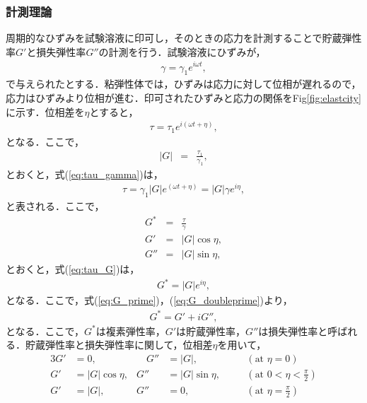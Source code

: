 \subsubsection{計測理論}
周期的なひずみを試験溶液に印可し，そのときの応力を計測することで貯蔵弾性率$G'$と損失弾性率$G''$の計測を行う．試験溶液にひずみが，
\begin{eqnarray}
    \gamma=\gamma_1e^{i\omega{}t} ,
\end{eqnarray}
で与えられたとする．粘弾性体では，ひずみは応力に対して位相が遅れるので，応力はひずみより位相が進む．印可されたひずみと応力の関係をFig\ref{fig:elastcity}に示す．位相差を$\eta$とすると，
\begin{eqnarray}
    \tau=\tau_1e^{i\left(\omega{}t+\eta\right)} ,
    \label{eq:tau_gamma}
\end{eqnarray}
となる．ここで，
\begin{eqnarray}
    |G| &=& \frac{\tau_1}{\gamma_1} ,
\end{eqnarray}
とおくと，式(\ref{eq:tau_gamma})は，
\begin{eqnarray}
    \tau=\gamma_1|G|e^{\left(\omega{}t+\eta\right)}=|G|\gamma{}e^{i\eta} ,
    \label{eq:tau_G}
\end{eqnarray}
と表される．ここで，
\begin{eqnarray}
    G^* &=& \frac{\tau}{\gamma}\\
    G' &=& |G|\cos\eta ,\label{eq:G_prime}\\
    G'' &=& |G|\sin\eta ,\label{eq:G_doubleprime}
\end{eqnarray}
とおくと，式(\ref{eq:tau_G})は，
\begin{eqnarray}
    G^* = |G|e^{i\eta} ,
    \label{eq:G_star}
\end{eqnarray}
となる．ここで，式(\ref{eq:G_prime})，(\ref{eq:G_doubleprime})より，
\begin{eqnarray}
    G^* = G'+iG'' ,
\end{eqnarray}
となる．ここで，$G^*$は複素弾性率，$G'$は貯蔵弾性率，$G''$は損失弾性率と呼ばれる\cite{生物レオロジー}\cite{化学者のためのレオロジー}．貯蔵弾性率と損失弾性率に関して，位相差$\eta$を用いて，
\begin{alignat}{3}
    G' & = 0 ,           & \quad G'' & = |G| ,         & \quad & \left(\text{at } \eta=0\right)               \label{eq:G_case1} \\
    G' & = |G|\cos\eta , & G''       & = |G|\sin\eta , &       & \left(\text{at } 0<\eta<\frac{\pi}{2}\right) \label{eq:G_case2} \\
    G' & = |G| ,         & G''       & = 0 ,           &       & \left(\text{at } \eta=\frac{\pi}{2}\right)   \label{eq:G_case3}
\end{alignat}
